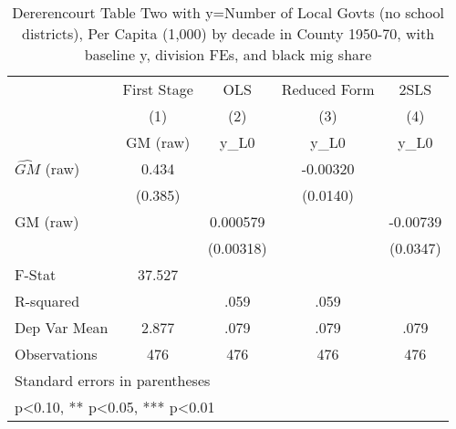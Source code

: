 \begin{table}[htbp]\centering
\def\sym#1{\ifmmode^{#1}\else\(^{#1}\)\fi}
\caption{Dererencourt Table Two with y=Number of Local Govts (no school districts), Per Capita (1,000) by decade in County 1950-70, with baseline y, division FEs, and black mig share}
\begin{tabular}{l*{4}{c}}
\toprule
                    & First Stage   &         OLS   &Reduced Form   &        2SLS   \\
                    &\multicolumn{1}{c}{(1)}&\multicolumn{1}{c}{(2)}&\multicolumn{1}{c}{(3)}&\multicolumn{1}{c}{(4)}\\
                    &\multicolumn{1}{c}{GM  (raw)}&\multicolumn{1}{c}{y\_L0}&\multicolumn{1}{c}{y\_L0}&\multicolumn{1}{c}{y\_L0}\\
\midrule
$\hat{GM}$ (raw)    &       0.434   &               &    -0.00320   &               \\
                    &     (0.385)   &               &    (0.0140)   &               \\
\addlinespace
GM  (raw)           &               &    0.000579   &               &    -0.00739   \\
                    &               &   (0.00318)   &               &    (0.0347)   \\
\midrule
F-Stat              &      37.527   &               &               &               \\
R-squared           &               &        .059   &        .059   &               \\
Dep Var Mean        &       2.877   &        .079   &        .079   &        .079   \\
Observations        &         476   &         476   &         476   &         476   \\
\bottomrule
\multicolumn{5}{l}{\footnotesize Standard errors in parentheses}\\
\multicolumn{5}{l}{\footnotesize * p<0.10, ** p<0.05, *** p<0.01}\\
\end{tabular}
\end{table}
